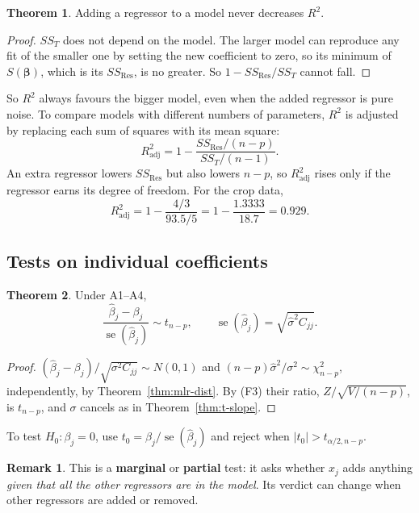 \documentclass[11pt,a4paper]{article}
\numberwithin{equation}{section}
\theoremstyle{definition}
\newtheorem{thm}{Theorem}[subsection]
\newtheorem*{remark}{Remark}
\begin{document}
\begin{thm}\label{thm:r2-increase}
Adding a regressor to a model never decreases $R^2$.
\end{thm}

\begin{proof}
$SS_T$ does not depend on the model. The larger model can reproduce any fit of the smaller
one by setting the new coefficient to zero, so its minimum of $S(\boldsymbol\beta)$, which
is its $SS_{\mathrm{Res}}$, is no greater. So $1 - SS_{\mathrm{Res}}/SS_T$ cannot fall.
\end{proof}

So $R^2$ always favours the bigger model, even when the added regressor is pure noise. To
compare models with different numbers of parameters, $R^2$ is adjusted by replacing each sum
of squares with its mean square:
\[
R^2_{\mathrm{adj}} = 1 - \frac{SS_{\mathrm{Res}}/(n - p)}{SS_T/(n - 1)} .
\]
An extra regressor lowers $SS_{\mathrm{Res}}$ but also lowers $n - p$, so $R^2_{\mathrm{adj}}$
rises only if the regressor earns its degree of freedom. For the crop data,
\[
R^2_{\mathrm{adj}} = 1 - \frac{4/3}{93.5/5} = 1 - \frac{1.3333}{18.7} = 0.929 .
\]

\subsection{Tests on individual coefficients}
\begin{thm}\label{thm:t-mlr}
Under A1--A4,
\[
\frac{\hat\beta_j - \beta_j}{\operatorname{se}(\hat\beta_j)} \sim t_{n-p},
\qquad \operatorname{se}(\hat\beta_j) = \sqrt{\hat\sigma^2 C_{jj}} .
\]
\end{thm}

\begin{proof}
$(\hat\beta_j - \beta_j)/\sqrt{\sigma^2 C_{jj}} \sim N(0,1)$ and
$(n-p)\hat\sigma^2/\sigma^2 \sim \chi^2_{n-p}$, independently, by Theorem~\ref{thm:mlr-dist}.
By (F3) their ratio, $Z/\sqrt{V/(n-p)}$, is $t_{n-p}$, and $\sigma$ cancels as in
Theorem~\ref{thm:t-slope}.
\end{proof}

To test $H_0\colon \beta_j = 0$, use $t_0 = \hat\beta_j/\operatorname{se}(\hat\beta_j)$ and
reject when $|t_0| > t_{\alpha/2, n-p}$.

\begin{remark}
This is a \textbf{marginal} or \textbf{partial} test: it asks whether $x_j$ adds anything
\emph{given that all the other regressors are in the model}. Its verdict can change when other
regressors are added or removed.
\end{remark}
\end{document}
